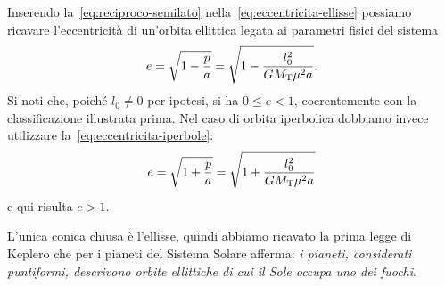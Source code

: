 Inserendo la~\eqref{eq:reciproco-semilato} nella~\eqref{eq:eccentricita-ellisse}
possiamo ricavare l'eccentricità di un'orbita ellittica legata ai parametri
fisici del sistema
\begin{equation}
  \label{eq:eccentricita-orbita-ellisse}
  e = \sqrt{1-\frac{p}{a}} = \sqrt{1-\frac{l_0^2}{GM_\textup{T}\mu^2a}}.
\end{equation}
Si noti che, poiché $l_0\neq 0$ per ipotesi, si ha $0\leq e<1$, coerentemente
con la classificazione illustrata prima. Nel caso di orbita iperbolica dobbiamo
invece utilizzare la~\eqref{eq:eccentricita-iperbole}:
\begin{equation}
  \label{eq:eccentricita-orbita-iperbole}
  e = \sqrt{1+\frac{p}{a}} = \sqrt{1+\frac{l_0^2}{GM_\textup{T}\mu^2a}}
\end{equation}
e qui risulta $e>1$.

L'unica conica chiusa è l'ellisse, quindi abbiamo ricavato la prima legge di
Keplero che per i pianeti del Sistema Solare afferma: \emph{i pianeti,
  considerati puntiformi, descrivono orbite ellittiche di cui il Sole occupa uno
  dei fuochi}.

